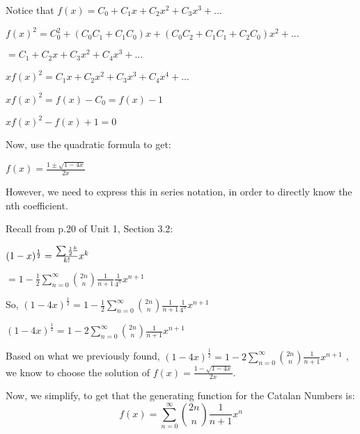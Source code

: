 \medbreak


\noindent Notice that $f(x) = C_0 + C_1x + C_2x^2 + C_3x^3 + ...$

\medbreak
${f(x)}^2 = C_0^2 + (C_0C_1 + C_1C_0)x + (C_0C_2 + C_1C_1 + C_2C_0) x^2 + ...$ 

\smallbreak
$= C_1 + C_2x + C_3x^2 + C_4x^3+ ... $

\medbreak

$x{f(x)}^2 = C_1x + C_2x^2 + C_3x^3 
+ C_4x^4 + ... $

\smallbreak

$x{f(x)}^2 = f(x) - C_0 = f(x) - 1$

\smallbreak

$x{f(x)}^2 - f(x) + 1 = 0$

\smallbreak
\noindent Now, use the quadratic formula to get: 

$f(x) = \frac{1\pm \sqrt{1-4x}}{2x}$

\noindent 
However, we need to express this in series notation, in order to directly know the nth coefficient.

\medbreak

\noindent Recall from p.20 of Unit 1, Section 3.2:

\smallbreak

\noindent $(1-x)^\frac{1}{2} = \frac{\sum {\frac{1}{2}}^{\underline{k}}}{k!} x^k$

\medbreak
$= 1 - \frac{1}{2}\sum_{n=0}^{\infty}\binom{2n}{n} \frac{1}{n+1}\frac{1}{4^n} x^{n+1}$

\medbreak

\noindent So, $(1-4x)^{\frac{1}{2}} = 1 - \frac{1}{2}\sum_{n=0}^{\infty}\binom{2n}{n} \frac{1}{n+1}\frac{1}{4^n} x^{n+1}$

\smallbreak
$(1-4x)^{\frac{1}{2}} = 1 - 2 \sum_{n=0}^{\infty}\binom{2n}{n} \frac{1}{n+1} x^{n+1}$ 

\medbreak

\noindent
Based on what we previously found, $(1-4x)^{\frac{1}{2}} = 1 - 2 \sum_{n=0}^{\infty}\binom{2n}{n} \frac{1}{n+1} x^{n+1}$ , we know to choose the solution of $f(x) = \frac{1 - \sqrt{1-4x}}{2x}$.

\medbreak

\noindent Now, we simplify, to get that the generating function for the Catalan Numbers is:
$$\boxed{f(x) = \sum_{n=0}^{\infty} \binom{2n}{n} \frac{1}{n+1} x^n}$$



% 
